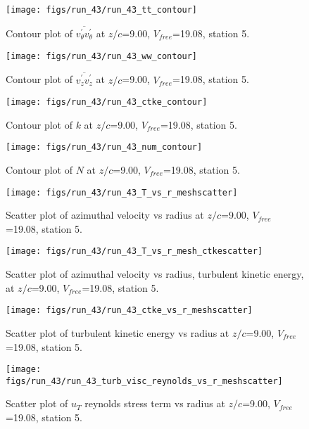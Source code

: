 \begin{figure}[H]
\centering
\texttt{[image: figs/run\_43/run\_43\_tt\_contour]}
\caption{Contour plot of $\overline{v_{\theta}^{\prime} v_{\theta}^{\prime}}$ at $z/c$=9.00, $V_{free}$=19.08, station 5.}
\end{figure}


\begin{figure}[H]
\centering
\texttt{[image: figs/run\_43/run\_43\_ww\_contour]}
\caption{Contour plot of $\overline{v_{z}^{\prime} v_{z}^{\prime}}$ at $z/c$=9.00, $V_{free}$=19.08, station 5.}
\end{figure}


\begin{figure}[H]
\centering
\texttt{[image: figs/run\_43/run\_43\_ctke\_contour]}
\caption{Contour plot of $k$ at $z/c$=9.00, $V_{free}$=19.08, station 5.}
\end{figure}


\begin{figure}[H]
\centering
\texttt{[image: figs/run\_43/run\_43\_num\_contour]}
\caption{Contour plot of $N$ at $z/c$=9.00, $V_{free}$=19.08, station 5.}
\end{figure}


\begin{figure}[H]
\centering
\texttt{[image: figs/run\_43/run\_43\_T\_vs\_r\_meshscatter]}
\caption{Scatter plot of azimuthal velocity vs radius at $z/c$=9.00, $V_{free}$=19.08, station 5.}
\end{figure}


\begin{figure}[H]
\centering
\texttt{[image: figs/run\_43/run\_43\_T\_vs\_r\_mesh\_ctkescatter]}
\caption{Scatter plot of azimuthal velocity vs radius, turbulent kinetic energy, at $z/c$=9.00, $V_{free}$=19.08, station 5.}
\end{figure}


\begin{figure}[H]
\centering
\texttt{[image: figs/run\_43/run\_43\_ctke\_vs\_r\_meshscatter]}
\caption{Scatter plot of turbulent kinetic energy vs radius at $z/c$=9.00, $V_{free}$=19.08, station 5.}
\end{figure}


\begin{figure}[H]
\centering
\texttt{[image: figs/run\_43/run\_43\_turb\_visc\_reynolds\_vs\_r\_meshscatter]}
\caption{Scatter plot of $
u_T$ reynolds stress term vs radius at $z/c$=9.00, $V_{free}$=19.08, station 5.}
\end{figure}



